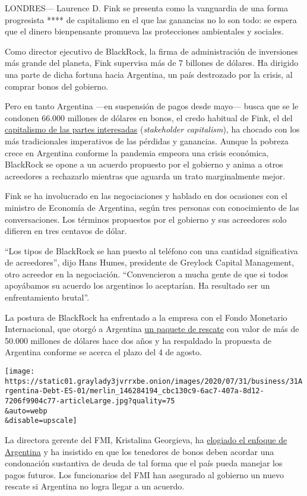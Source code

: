 LONDRES--- Laurence D. Fink se presenta como la vanguardia de una forma
progresista **** de capitalismo en el que las ganancias no lo son todo:
se espera que el dinero bienpensante promueva las protecciones
ambientales y sociales.

Como director ejecutivo de BlackRock, la firma de administración de
inversiones más grande del planeta, Fink supervisa más de 7 billones de
dólares. Ha dirigido una parte de dicha fortuna hacia Argentina, un país
destrozado por la crisis, al comprar bonos del gobierno.

Pero en tanto Argentina ---en suspensión de pagos desde mayo--- busca
que se le condonen 66.000 millones de dólares en bonos, el credo
habitual de Fink, el del
\href{https://www.alainet.org/es/articulo/204355}{capitalismo de las
partes interesadas} (\emph{stakeholder capitalism}), ha chocado con los
más tradicionales imperativos de las pérdidas y ganancias. Aunque la
pobreza crece en Argentina conforme la pandemia empeora una crisis
económica, BlackRock se opone a un acuerdo propuesto por el gobierno y
anima a otros acreedores a rechazarlo mientras que aguarda un trato
marginalmente mejor.

Fink se ha involucrado en las negociaciones y hablado en dos ocasiones
con el ministro de Economía de Argentina, según tres personas con
conocimiento de las conversaciones. Los términos propuestos por el
gobierno y sus acreedores solo difieren en tres centavos de dólar.

``Los tipos de BlackRock se han puesto al teléfono con una cantidad
significativa de acreedores'', dijo Hans Humes, presidente de Greylock
Capital Management, otro acreedor en la negociación. ``Convencieron a
mucha gente de que si todos apoyábamos su acuerdo los argentinos lo
aceptarían. Ha resultado ser un enfrentamiento brutal''.

La postura de BlackRock ha enfrentado a la empresa con el Fondo
Monetario Internacional, que otorgó a Argentina
\href{https://www.nytimes3xbfgragh.onion/2018/06/07/business/argentina-imf-debt.html}{un
paquete de rescate} con valor de más de 50.000 millones de dólares hace
dos años y ha respaldado la propuesta de Argentina conforme se acerca el
plazo del 4 de agosto.

\texttt{[image: https://static01.graylady3jvrrxbe.onion/images/2020/07/31/business/31Argentina-Debt-ES-01/merlin\_146284194\_cbc130c9-6ac7-407a-8d12-7206f9904c77-articleLarge.jpg?quality=75\\\&auto=webp\\\&disable=upscale]}

La directora gerente del FMI, Kristalina Georgieva, ha
\href{https://www.imf.org/es/News/Articles/2020/02/04/pr2034-statement-by-imf-managing-director-kristalina-georgieva-on-argentina}{elogiado
el enfoque de Argentina} y ha insistido en que los tenedores de bonos
deben acordar una condonación sustantiva de deuda de tal forma que el
país pueda manejar los pagos futuros. Los funcionarios del FMI han
asegurado al gobierno un nuevo rescate si Argentina no logra llegar a un
acuerdo.

